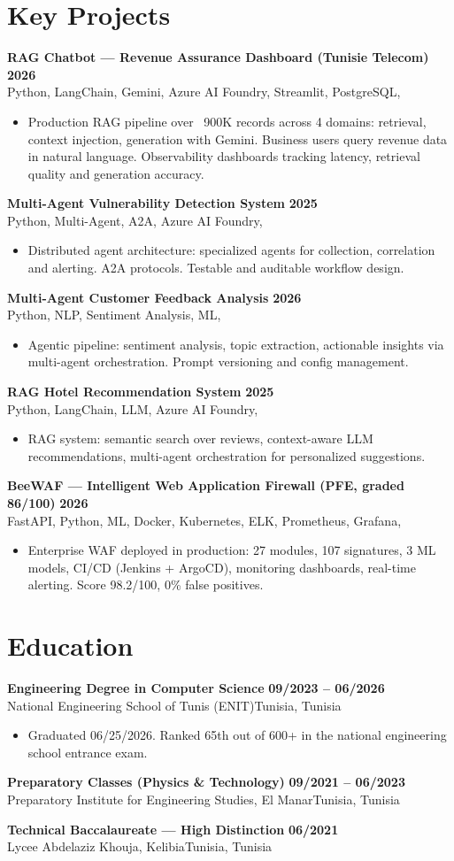 \documentclass[a4paper,8.5pt]{article}
\newcommand{\cventry}[4]{\textbf{#1} \hfill \textbf{#4}\\[0.2pt]#2{\ifx\relax#3\relax\else, #3\fi}\par\vspace{0.3pt}}
\begin{document}
\section{Key Projects}
\cventry{RAG Chatbot --- Revenue Assurance Dashboard (Tunisie Telecom)}{Python, LangChain, Gemini, Azure AI Foundry, Streamlit, PostgreSQL}{}{2026}
\begin{itemize}
  \item Production RAG pipeline over ~900K records across 4 domains: retrieval, context injection, generation with Gemini. Business users query revenue data in natural language. Observability dashboards tracking latency, retrieval quality and generation accuracy.
\end{itemize}
\cventry{Multi-Agent Vulnerability Detection System}{Python, Multi-Agent, A2A, Azure AI Foundry}{}{2025}
\begin{itemize}
  \item Distributed agent architecture: specialized agents for collection, correlation and alerting. A2A protocols. Testable and auditable workflow design.
\end{itemize}
\cventry{Multi-Agent Customer Feedback Analysis}{Python, NLP, Sentiment Analysis, ML}{}{2026}
\begin{itemize}
  \item Agentic pipeline: sentiment analysis, topic extraction, actionable insights via multi-agent orchestration. Prompt versioning and config management.
\end{itemize}
\cventry{RAG Hotel Recommendation System}{Python, LangChain, LLM, Azure AI Foundry}{}{2025}
\begin{itemize}
  \item RAG system: semantic search over reviews, context-aware LLM recommendations, multi-agent orchestration for personalized suggestions.
\end{itemize}
\cventry{BeeWAF --- Intelligent Web Application Firewall (PFE, graded 86/100)}{FastAPI, Python, ML, Docker, Kubernetes, ELK, Prometheus, Grafana}{}{2026}
\begin{itemize}
  \item Enterprise WAF deployed in production: 27 modules, 107 signatures, 3 ML models, CI/CD (Jenkins + ArgoCD), monitoring dashboards, real-time alerting. Score 98.2/100, 0\% false positives.
\end{itemize}
\section{Education}
\cventry{Engineering Degree in Computer Science}{National Engineering School of Tunis (ENIT)}{Tunisia}{09/2023 -- 06/2026}
\begin{itemize}
  \item Graduated 06/25/2026. Ranked 65th out of 600+ in the national engineering school entrance exam.
\end{itemize}
\cventry{Preparatory Classes (Physics \& Technology)}{Preparatory Institute for Engineering Studies, El Manar}{Tunisia}{09/2021 -- 06/2023}
\cventry{Technical Baccalaureate --- High Distinction}{Lycee Abdelaziz Khouja, Kelibia}{Tunisia}{06/2021}
\end{document}
